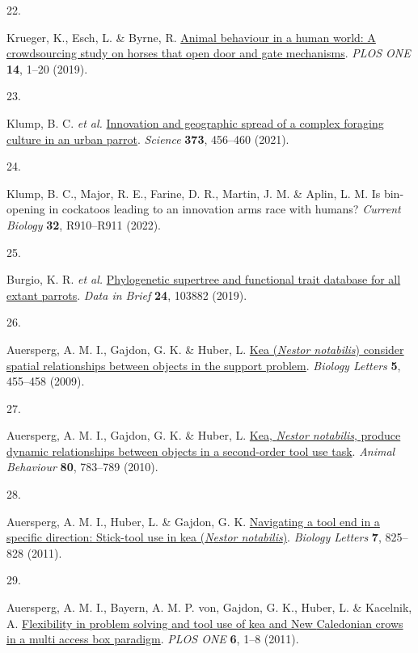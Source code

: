 \documentclass[
  man,floatsintext]{apa6}
\newlength{\cslhangindent}
\newlength{\csllabelwidth}
\newlength{\cslentryspacingunit} %
\newenvironment{CSLReferences}[2] %
 {%
  \setlength{\parindent}{0pt}
  \ifodd #1
  \let\oldpar\par
  \def\par{\hangindent=\cslhangindent\oldpar}
  \fi
  \setlength{\parskip}{#2\cslentryspacingunit}
 }%
 {}
\newcommand{\CSLLeftMargin}[1]{\parbox[t]{\csllabelwidth}{#1}}
\newcommand{\CSLRightInline}[1]{\parbox[t]{\linewidth - \csllabelwidth}{#1}\break}
\begin{document}
\begin{CSLReferences}{0}{0}
\leavevmode{}%
\CSLLeftMargin{22. }%
\CSLRightInline{Krueger, K., Esch, L. \& Byrne, R. \href{https://doi.org/10.1371/journal.pone.0218954}{Animal behaviour in a human world: A crowdsourcing study on horses that open door and gate mechanisms}. \emph{PLOS ONE} \textbf{14}, 1--20 (2019).}

\leavevmode{}%
\CSLLeftMargin{23. }%
\CSLRightInline{Klump, B. C. \emph{et al.} \href{https://doi.org/10.1126/science.abe7808}{Innovation and geographic spread of a complex foraging culture in an urban parrot}. \emph{Science} \textbf{373}, 456--460 (2021).}

\leavevmode{}%
\CSLLeftMargin{24. }%
\CSLRightInline{Klump, B. C., Major, R. E., Farine, D. R., Martin, J. M. \& Aplin, L. M. Is bin-opening in cockatoos leading to an innovation arms race with humans? \emph{Current Biology} \textbf{32}, R910--R911 (2022).}

\leavevmode{}%
\CSLLeftMargin{25. }%
\CSLRightInline{Burgio, K. R. \emph{et al.} \href{https://doi.org/10.1016/j.dib.2019.103882}{Phylogenetic supertree and functional trait database for all extant parrots}. \emph{Data in Brief} \textbf{24}, 103882 (2019).}

\leavevmode{}%
\CSLLeftMargin{26. }%
\CSLRightInline{Auersperg, A. M. I., Gajdon, G. K. \& Huber, L. \href{https://doi.org/10.1098/rsbl.2009.0114}{Kea (\emph{{N}estor notabilis}) consider spatial relationships between objects in the support problem}. \emph{Biology Letters} \textbf{5}, 455--458 (2009).}

\leavevmode{}%
\CSLLeftMargin{27. }%
\CSLRightInline{Auersperg, A. M. I., Gajdon, G. K. \& Huber, L. \href{https://doi.org/10.1016/j.anbehav.2010.08.007}{Kea, \emph{{N}estor notabilis}, produce dynamic relationships between objects in a second-order tool use task}. \emph{Animal Behaviour} \textbf{80}, 783--789 (2010).}

\leavevmode{}%
\CSLLeftMargin{28. }%
\CSLRightInline{Auersperg, A. M. I., Huber, L. \& Gajdon, G. K. \href{https://doi.org/10.1098/rsbl.2011.0388}{Navigating a tool end in a specific direction: Stick-tool use in kea (\emph{{N}estor notabilis})}. \emph{Biology Letters} \textbf{7}, 825--828 (2011).}

\leavevmode{}%
\CSLLeftMargin{29. }%
\CSLRightInline{Auersperg, A. M. I., Bayern, A. M. P. von, Gajdon, G. K., Huber, L. \& Kacelnik, A. \href{https://doi.org/10.1371/journal.pone.0020231}{Flexibility in problem solving and tool use of kea and {N}ew {C}aledonian crows in a multi access box paradigm}. \emph{PLOS ONE} \textbf{6}, 1--8 (2011).}


\end{CSLReferences}
\end{document}
